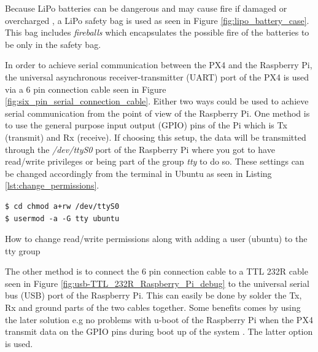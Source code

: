 \documentclass[../Head/report.tex]{subfiles}
\begin{document}
Because LiPo batteries can be dangerous and may cause fire if damaged or overcharged \cite{lipoBatteryGuide}, a LiPo safety bag is used as seen in Figure \ref{fig:lipo_battery_case}. This bag includes \textit{fireballs} which encapsulates the possible fire of the batteries to be only in the safety bag. 

In order to achieve serial communication between the PX4 and the Raspberry Pi, the universal asynchronous receiver-transmitter (UART) port of the PX4 is used via a 6 pin connection cable seen in Figure \ref{fig:six_pin_serial_connection_cable}. Either two ways could be used to achieve serial communication from the point of view of the Raspberry Pi. One method is to use the general purpose input output (GPIO) pins of the Pi which is Tx (transmit) and Rx (receive). If choosing this setup, the data will be transmitted through the \textit{/dev/ttyS0} port of the Raspberry Pi where you got to have read/write privileges or being part of the group \textit{tty} to do so. These settings can be changed accordingly from the terminal in Ubuntu as seen in Listing \ref{lst:change_permissions}. 

\begin{listing}[H] 
\begin{tcolorbox}[
    enhanced,
    attach boxed title to top left={xshift=6mm,yshift=-3mm},
    colback=lightgreen!20,
    colframe=lightgreen,
    fonttitle=\bfseries\color{black},
]
\begin{verbatim}
$ cd chmod a+rw /dev/ttyS0
$ usermod -a -G tty ubuntu
\end{verbatim}
\end{tcolorbox}
\caption{How to change read/write permissions along with adding a user (ubuntu) to the tty group}
\label{lst:change_permissions}    
\end{listing} 

The other method is to connect the 6 pin connection cable to a TTL 232R cable seen in Figure \ref{fig:usb-TTL_232R_Raspberry_Pi_debug} to the universal serial bus (USB) port of the Raspberry Pi. This can easily be done by solder the Tx, Rx and ground parts of the two cables together. Some benefits comes by using the later solution e.g no problems with u-boot of the Raspberry Pi when the PX4 transmit data on the GPIO pins during boot up of the system  \cite{uBoot}. The latter option is used.
\end{document}
